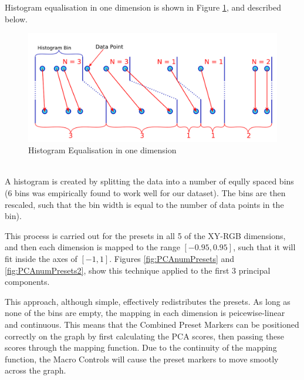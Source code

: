 \documentclass[11pt, oneside]{report}   	%
\begin{document}
Histogram equalisation in one dimension is shown in Figure \ref{fig:HistEq}, and described below.
\begin{figure}[h] 
	\centering
	\includegraphics[trim={0, 5pt, 0, 5pt}, clip, width = 6in]{HistogramEquilisation.png}
	\caption{Histogram Equalisation in one dimension}
	\label{fig:HistEq}
\end{figure}\\
A histogram is created by splitting the data into a number of eqully spaced bins (6 bins was empirically found to work well for our dataset). The bins are then rescaled, such that the bin width is equal to the number of data points in the bin).

This process is carried out for the presets in all 5 of the XY-RGB dimensions, and then each dimension is mapped to the range $[-0.95, 0.95]$, such that it will fit inside the axes of $[-1, 1]$. Figures \ref{fig:PCAnumPresets} and \ref{fig:PCAnumPresets2}, show this technique applied to the first 3 principal components.

This approach, although simple, effectively redistributes the presets. As long as none of the bins are empty, the mapping in each dimension is peicewise-linear and continuous. This means that the Combined Preset Markers can be positioned correctly on the graph by first calculating the PCA scores, then passing these scores through the mapping function. Due to the continuity of the mapping function, the Macro Controls will cause the preset markers to move smootly across the graph.
\end{document}
